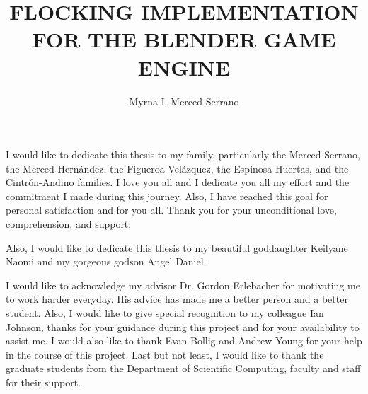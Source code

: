 \documentclass[11pt]{fsuthesis}
\title{FLOCKING IMPLEMENTATION FOR THE BLENDER GAME ENGINE}
\author{Myrna I. Merced Serrano}
\begin{document}
\frontmatter
\maketitle
\makesignaturepage

\begin{dedication}
I would like to dedicate this thesis to my family, particularly the Merced-Serrano, the Merced-Hern\'{a}ndez, the Figueroa-Vel\'{a}zquez, the Espinosa-Huertas, and the Cintr\'{o}n-Andino families. I love you all and I dedicate you all my effort and the commitment I made during this journey. Also, I have reached this goal for personal satisfaction and for you all. Thank you for your unconditional love, comprehension, and support. 

Also, I would like to dedicate this thesis to my beautiful goddaughter Keilyane Naomi and my gorgeous godson Angel Daniel.

\end{dedication}

\begin{acknowledgments}
I would like to acknowledge my advisor Dr. Gordon Erlebacher for motivating me to work harder everyday. His advice has made me a better person and a better student. Also, I would like to give special recognition to my colleague Ian Johnson, thanks for your guidance during this project and for your availability to assist me. I would also like to thank Evan Bollig and Andrew Young for your help in the course of this project. Last but not least, I would like to thank the graduate students from the Department of Scientific Computing, faculty and staff for their support.
\end{acknowledgments}

\tableofcontents
\listoftables
\listoffigures



\onehalfspacing
\end{document}
